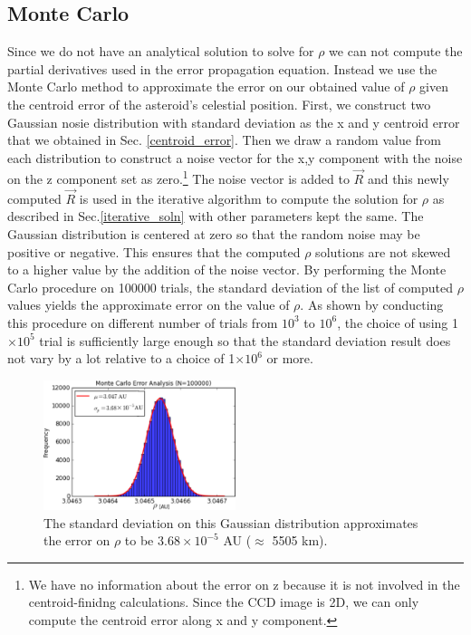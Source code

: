 \documentclass[authoryear, 12pt,5p, times]{elsarticle}
\begin{document}
\subsection{Monte Carlo}
\label{monte_carlo}
Since we do not have an analytical solution to solve for $\rho$ we can not compute the partial derivatives used in the error propagation equation. Instead we use the Monte Carlo method to approximate the error on our obtained value of $\rho$ given the centroid error of the asteroid's celestial position. First, we construct two Gaussian nosie distribution with standard deviation as the x and y centroid error that we obtained in Sec. \ref{centroid_error}. Then we draw a random value from each distribution to construct a noise vector for the x,y component with the noise on the z component set as zero.\footnote{ We have no information about the error on z  because it is not involved in the centroid-finidng calculations. Since the CCD image is 2D, we can only compute the centroid error along x and y component.}  The noise vector is added to $\vec{R}$ and this newly computed $\vec{R}$ is used in the iterative algorithm to compute the solution for $\rho$ as described in Sec.\ref{iterative_soln} with other parameters kept the same. The Gaussian distribution is centered at zero so that the random noise may be positive or negative. This ensures that the computed $\rho$ solutions are not skewed to  a higher value by the addition of the noise vector. By performing the Monte Carlo procedure on 100000 trials, the standard deviation of the list of computed $\rho$ values yields the approximate error on the value of $\rho$. As shown by conducting this procedure on different number of trials from $10^3$ to $10^6$, the choice of using 1$\times10^5$ trial is sufficiently large enough so that the standard deviation result does not vary by a lot relative to a choice of 1$\times10^6$ or more.
    	\begin{figure}[h!]
\includegraphics[width=0.5\textwidth]{figures/monte_carlo_result}
\caption{The standard deviation on this Gaussian distribution approximates the error on $\rho$ to be $3.68\times10^{-5}$ AU ($\approx$ 5505 km).}
\label{monte_carlo_result}
\end{figure}
\end{document}
